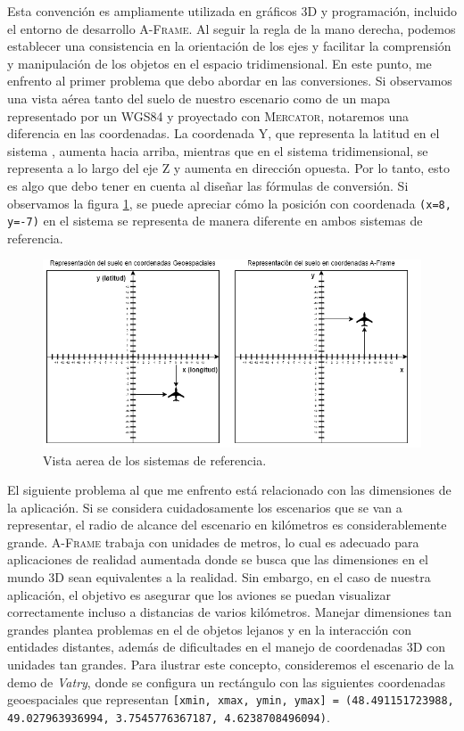 \documentclass[a4paper, 11pt]{book}
\begin{document}
Esta convención es ampliamente utilizada en gráficos \textsc{3D} y programación, incluido el entorno de desarrollo \textsc{A-Frame}. Al seguir la regla de la mano derecha, podemos establecer una consistencia en la orientación de los ejes y facilitar la comprensión y manipulación de los objetos en el espacio tridimensional.
En este punto, me enfrento al primer problema que debo abordar en las conversiones. Si observamos una vista aérea tanto del suelo de nuestro escenario como de un mapa representado por un  \textsc{WGS84} y proyectado con \textsc{Mercator}, notaremos una diferencia en las coordenadas.
La coordenada \textsc{Y}, que representa la latitud en el sistema , aumenta hacia arriba, mientras que en el sistema tridimensional, se representa a lo largo del eje \textsc{Z} y aumenta en dirección opuesta. Por lo tanto, esto es algo que debo tener en cuenta al diseñar las fórmulas de conversión.
Si observamos la figura \ref{fig:sistemasDeReferencia}, se puede apreciar cómo la posición con coordenada \texttt{(x=8, y=-7)} en el sistema  se representa de manera diferente en ambos sistemas de referencia.
\begin{figure}[h]
  \centering
  \includegraphics[width=15cm, keepaspectratio]{img/sistemasDeReferencia.drawio.png}
  \caption{Vista aerea de los sistemas de referencia.}
  \label{fig:sistemasDeReferencia}
\end{figure}

El siguiente problema al que me enfrento está relacionado con las dimensiones de la aplicación. Si se considera cuidadosamente los escenarios que se van a representar, el radio de alcance del escenario en kilómetros es considerablemente grande. \textsc{A-Frame} trabaja con unidades de metros, lo cual es adecuado para aplicaciones de realidad aumentada donde se busca que las dimensiones en el mundo 3D sean equivalentes a la realidad. Sin embargo, en el caso de nuestra aplicación, el objetivo es asegurar que los aviones se puedan visualizar correctamente incluso a distancias de varios kilómetros. Manejar dimensiones tan grandes plantea problemas en el  de objetos lejanos y en la interacción con entidades distantes, además de dificultades en el manejo de coordenadas 3D con unidades tan grandes.
Para ilustrar este concepto, consideremos el escenario de la demo de \emph{Vatry}, donde se configura un rectángulo con las siguientes coordenadas geoespaciales que representan \texttt{[xmin, xmax, ymin, ymax] = (48.491151723988, 49.027963936994, 3.7545776367187, 4.6238708496094)}. 
\end{document}
